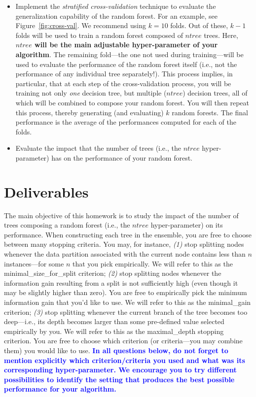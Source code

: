 \documentclass[letterpaper]{article}
\newcommand{\HIGHLIGHT}[1]{\textcolor{blue}{\textbf{#1}}}
\begin{document}
\begin{itemize}
\item Implement the \textit{stratified cross-validation} technique to evaluate the generalization capability of the random forest. For an example, see Figure~\ref{fig:cross-val}. We recommend using $k=10$ folds. Out of these, $k-1$ folds will be used to train a random forest composed of $ntree$ trees. Here, \textbf{$ntree$ will be the main adjustable hyper-parameter of your algorithm}. The remaining fold---the one not used during training---will be used to evaluate the performance of the random forest itself (i.e., not the performance of any individual tree separately!). This process implies, in particular, that at each step of the cross-validation process, you will be training not only \textit{one} decision tree, but multiple ($ntree$) decision trees, all of which will be combined to compose your random forest. You will then repeat this process, thereby generating (and evaluating) $k$ random forests. The final performance is the average of the performances computed for each of the folds.
\item Evaluate the impact that the number of trees (i.e., the $ntree$ hyper-parameter) has on the performance of your random forest.


\end{itemize}



\section{Deliverables}

The main objective of this homework is to study the impact of the number of trees composing a  random forest (i.e., the $ntree$ hyper-parameter) on its performance. When constructing each tree in the ensemble, you are free to choose between many stopping criteria. You may, for instance, \textit{(1)} stop splitting nodes whenever the data partition associated with the current node contains less than $n$ instances---for some $n$ that you pick empirically. We will refer to this as the minimal\_size\_for\_split criterion; \textit{(2)} stop splitting nodes whenever the information gain resulting from a split is not sufficiently high (even though it may be slightly higher than zero). You are free to empirically pick the minimum information gain that you'd like to use. We will refer to this as the 
minimal\_gain criterion; \textit{(3)} stop splitting whenever the current branch of the tree becomes too deep---i.e., its depth becomes larger than some pre-defined value selected empirically by you. We will refer to this as the maximal\_depth stopping criterion. You are free to choose which criterion (or criteria---you may combine them) you would like to use. \HIGHLIGHT{In all questions below, do not forget to mention explicitly which criterion/criteria you used and what was its corresponding hyper-parameter. We encourage you to try different possibilities to identify the setting that produces the best possible performance for your algorithm.}
\end{document}
